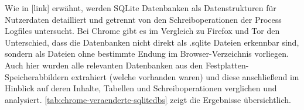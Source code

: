 \begin{appendices}
Wie in [link] erwähnt, werden SQLite Datenbanken als Datenstrukturen für Nutzerdaten
detailliert und getrennt von den Schreiboperationen der Process Logfiles untersucht. Bei Chrome gibt es im Vergleich zu Firefox und Tor den Unterschied, dass die Datenbanken nicht direkt als .sqlite Dateien erkennbar sind, sondern als Dateien ohne bestimmte Endung im Browser-Verzeichnis vorliegen. \\ 
Auch hier wurden alle relevanten Datenbanken aus den Festplatten-Speicherabbildern extrahiert (welche vorhanden waren) und diese anschließend im Hinblick auf deren Inhalte, Tabellen und Schreiboperationen verglichen und analysiert. \autoref{tab:chrome-veraenderte-sqlitedbs} zeigt die Ergebnisse übersichtlich.

\begin{table}[h!]
	\centering
	\caption{Veränderung der Firefox SQLite-Datenbänke während der Versuchsdurchführung}
	\label{tab:chrome-veraenderte-sqlitedbs}  
\end{table}
\end{appendices}
